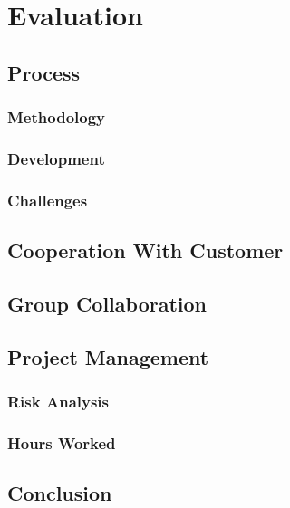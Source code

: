 
\chapter{Evaluation}

\section{Process}
\subsection{Methodology}
\subsection{Development}
\subsection{Challenges}

\section{Cooperation With Customer}

\section{Group Collaboration}

\section{Project Management}
\subsection{Risk Analysis}
\subsection{Hours Worked}

\section{Conclusion}


\cleardoublepage